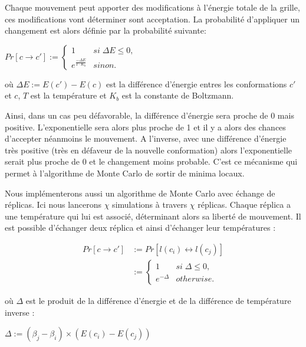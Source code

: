Chaque mouvement peut apporter des modifications à l'énergie totale de la grille, ces modifications vont déterminer sont acceptation. La probabilité d'appliquer un changement est alors définie par la probabilité suivante:

\begin{center}
    $Pr[c\rightarrow {c}'] := \left\{\begin{matrix}
    1 & si \; \Delta E\leq 0,\\
    e^{\frac{-\Delta E}{T\cdot K_b}} & sinon.
    \end{matrix}\right.$    
\end{center}

où $\Delta E := E({c}') - E(c)$ est la différence d'énergie entres les conformations ${c}'$ et $c$, $T$ est la température et $K_b$ est la constante de Boltzmann.

Ainsi, dans un cas peu défavorable, la différence d'énergie sera proche de 0 mais positive. L'exponentielle sera alors plus proche de 1 et il y a alors des chances d'accepter néanmoins le mouvement. A l'inverse, avec une différence d'énergie très positive (très en défaveur de la nouvelle conformation) alors l’exponentielle serait plus proche de 0 et le changement moins probable. C'est ce mécanisme qui permet  à l'algorithme de Monte Carlo de sortir de minima locaux.

Nous implémenterons aussi un algorithme de Monte Carlo avec échange de réplicas. Ici nous lancerons $\chi$ simulations à travers $\chi$ réplicas. Chaque réplica a une température qui lui est associé, déterminant alors sa liberté de mouvement. Il est possible d'échanger deux réplica et ainsi d'échanger leur températures :

\begin{center}
\begin{align*}
    Pr[c\rightarrow {c}'] &:= Pr[l(c_i)\leftrightarrow l(c_j)]\\
    &:= \left\{\begin{matrix}
    1 & si \; \Delta \leq 0,\\
    e^{-\Delta} & otherwise.
    \end{matrix}\right.
\end{align*}
\end{center}

où $\Delta$ est le produit de la différence d'énergie et de la différence de température inverse :

\begin{center}
    $\Delta := (\beta_j-\beta_i)\times (E(c_i)-E(c_j))$
\end{center}

